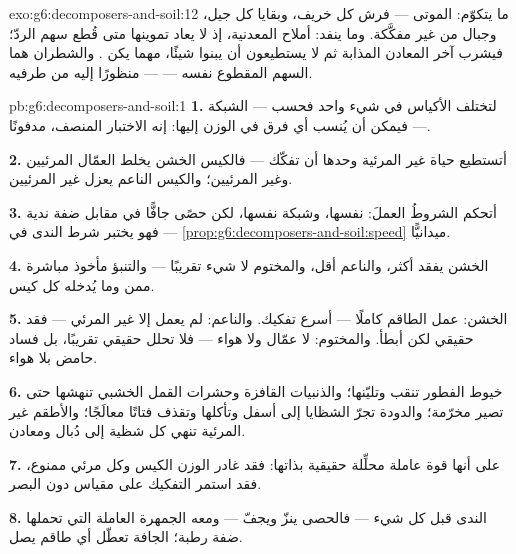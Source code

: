 \begin{solution}{exo:g6:decomposers-and-soil:12}
ما يتكوّم: الموتى --- فرش كل خريف، وبقايا كل جيل، وجبال من  غير مفكَّكة. وما ينفد: أملاح  المعدنية، إذ لا يعاد
تموينها متى قُطع سهم الردّ؛ فيشرب  آخر المعادن المذابة ثم
لا يستطيعون أن يبنوا شيئًا، مهما يكن . والشطران هما السهم
المقطوع نفسه ---  --- منظورًا إليه من طرفيه.
\end{solution}

\begin{solution}{pb:g6:decomposers-and-soil:1}
\textbf{1.} لتختلف الأكياس في شيء واحد فحسب --- الشبكة --- فيمكن
أن يُنسب أي فرق في الوزن إليها: إنه الاختبار المنصف، مدفونًا.

\textbf{2.} أتستطيع حياة  غير المرئية وحدها أن تفكّك
 --- فالكيس الخشن يخلط العمّال المرئيين وغير المرئيين؛
والكيس الناعم يعزل غير المرئيين.

\textbf{3.} أتحكم الشروطُ العملَ:  نفسها، وشبكة نفسها، لكن
حصًى جافًّا في مقابل ضفة ندية --- فهو يختبر شرط الندى في
\cref{prop:g6:decomposers-and-soil:speed} ميدانيًّا.

\textbf{4.} الخشن يفقد أكثر، والناعم أقل، والمختوم لا شيء
تقريبًا --- والتنبؤ مأخوذ مباشرة ممن وما يُدخله كل كيس.

\textbf{5.} الخشن: عمل الطاقم كاملًا --- أسرع تفكيك. والناعم: لم
يعمل إلا غير المرئي --- فقد حقيقي لكن أبطأ. والمختوم: لا عمّال
ولا هواء --- فلا تحلل حقيقي تقريبًا، بل فساد حامض بلا هواء.

\textbf{6.} خيوط الفطور تنقب  وتليّنها؛ والذنبيات القافزة
وحشرات القمل الخشبي تنهشها حتى تصير مخرّمة؛ والدودة تجرّ الشظايا
إلى أسفل وتأكلها وتقذف فتاتًا معالَجًا؛ والأطقم غير المرئية تنهي كل
شظية إلى دُبال ومعادن.

\textbf{7.} على أنها قوة عاملة محلِّلة حقيقية بذاتها: فقد غادر
الوزن الكيس وكل  مرئي ممنوع، فقد استمر التفكيك على مقياس دون
البصر.

\textbf{8.} الندى قبل كل شيء --- فالحصى ينزّ ويجفّ --- ومعه
الجمهرة العاملة التي تحملها ضفة رطبة؛  الجافة تعطّل أي
طاقم يصل.


\end{solution}
